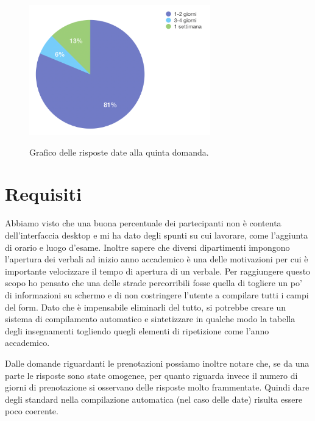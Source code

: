 \documentclass[Lau, oneside, noexaminfo]{sapthesis}%
\begin{document}
\begin{figure}[H]
	\caption{Grafico delle risposte date alla quinta domanda.}
	\centering
	\includegraphics[width=0.7\textwidth]{d-v}
	\label{fig:d-v}
\end{figure}

\section{Requisiti}
\label{sec:req}
Abbiamo visto che una buona percentuale dei partecipanti non è contenta dell'interfaccia desktop e mi ha dato degli spunti su cui lavorare, come l'aggiunta di orario e luogo d'esame. Inoltre sapere che diversi dipartimenti impongono l'apertura dei verbali ad inizio anno accademico è una delle motivazioni per cui è importante velocizzare il tempo di apertura di un verbale. Per raggiungere questo scopo ho pensato che una delle strade percorribili fosse quella di togliere un po' di informazioni su schermo e di non costringere l'utente a compilare tutti i campi del form. Dato che è impensabile eliminarli del tutto, si potrebbe creare un sistema di compilamento automatico e sintetizzare in qualche modo la tabella degli insegnamenti togliendo quegli elementi di ripetizione come l'anno accademico.

Dalle domande riguardanti le prenotazioni possiamo inoltre notare che, se da una parte le risposte sono state omogenee, per quanto riguarda invece il numero di giorni di prenotazione si osservano delle risposte molto frammentate. Quindi dare degli standard nella compilazione automatica (nel caso delle date) risulta essere poco coerente.
\end{document}
